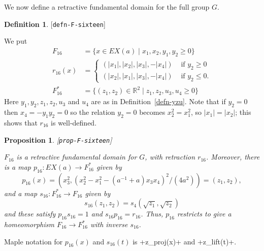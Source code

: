 \documentclass[reqno]{amsart}
\newcommand{\lbl}[1]{\label{#1}\textup{[\texttt{#1}]}\par}
\newcommand{\lbl}{\label}
\newcommand{\R}         {{\mathbb{R}}}
\newcommand{\st}        {\;|\;}
\renewcommand{\:}{\colon}
\newtheorem{proposition}[theorem]{Proposition}
\theoremstyle{definition}
\newtheorem{definition}[theorem]{Definition}
\begin{document}
We now define a retractive fundamental domain for the full group $G$.
\begin{definition}\lbl{defn-F-sixteen}
 We put
 \begin{align*}
  F_{16} &= \{x\in EX(a) \st x_1,x_2,y_1,y_2\geq 0\} \\
  r_{16}(x) &=
   \begin{cases}
    (|x_1|,|x_2|,|x_3|,-|x_4|) & \text{ if } y_2\geq 0 \\
    (|x_2|,|x_1|,|x_3|,-|x_4|) & \text{ if } y_2\leq 0.
   \end{cases} \\
  F_{16}^* &= \{(z_1,z_2)\in\R^2\st z_1,z_2,u_3,u_4\geq 0\}
 \end{align*}
 Here $y_1,y_2,z_1,z_2,u_3$ and $u_4$ are as in
 Definition~\ref{defn-yzu}.  Note that if $y_2=0$ then
 $x_4=-y_1y_2=0$ so the relation $y_2=0$ becomes $x_2^2=x_1^2$, so
 $|x_1|=|x_2|$; this shows that $r_{16}$ is well-defined.
\end{definition}
\begin{proposition}\lbl{prop-F-sixteen}
 $F_{16}$ is a retractive fundamental domain for $G$, with retraction
 $r_{16}$.  Moreover, there is a map $p_{16}\:EX(a)\to F_{16}^*$ given by
 \[ p_{16}(x) = (x_3^2,(x_2^2 - x_1^2 - (a^{-1}+a)x_3x_4)^2/(4a^2))
              = (z_1,z_2),
 \]
 and a map $s_{16}\:F_{16}^*\to F_{16}$ given by
 \[ s_{16}(z_1,z_2) = s_4(\sqrt{z_1},\sqrt{z_2}) \]
 and these satisfy $p_{16}s_{16}=1$ and $s_{16}p_{16}=r_{16}$.  Thus,
 $p_{16}$ restricts to give a homeomorphism $F_{16}\to F_{16}^*$ with
 inverse $s_{16}$.
\end{proposition}
Maple notation for $p_{16}(x)$ and $s_{16}(t)$ is \mcode+z_proj(x)+ and
\mcode+z_lift(t)+.
\end{document}
